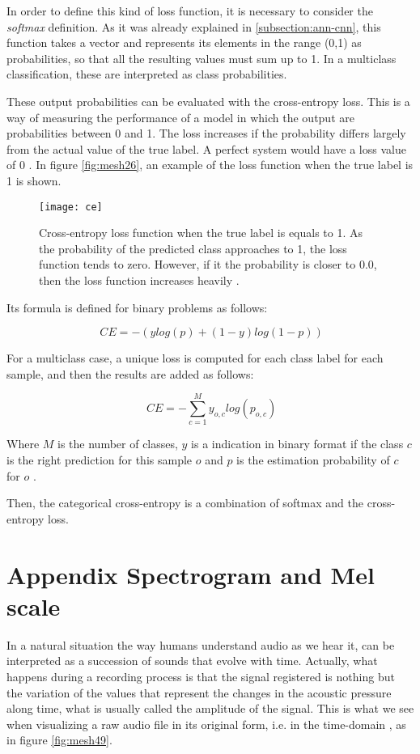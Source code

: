 	In order to define this kind of loss function, it is necessary to consider the \textit{softmax} definition. As it was already explained in \ref{subsection:ann-cnn}, this function takes a vector and represents its elements in the range (0,1) as probabilities, so that all the resulting values must sum up to 1. In a multiclass classification, these are interpreted as class probabilities.
	
	These output probabilities can be evaluated with the cross-entropy loss. This is a way of measuring the performance of a model in which the output are probabilities between 0 and 1. The loss increases if the probability differs largely from the actual value of the true label. A perfect system would have a loss value of 0 \cite{MLGlossary2017}. In figure \ref{fig:mesh26}, an example of the loss function when the true label is 1 is shown.
	
	\begin{figure}[H]
		\centering
		\captionsetup{justification=centering}
		\texttt{[image: ce]}
		\caption{Cross-entropy loss function when the true label is equals to 1. As the probability of the predicted class approaches to 1, the loss function tends to zero. However, if it the probability is closer to 0.0, then the loss function increases heavily \cite{MLGlossary2017}.}
	\end{figure}

	Its formula is defined for binary problems as follows:
	
	\[
	\ CE = -(ylog(p) + (1 - y)log(1 - p))
	\]

	For a multiclass case, a unique loss is computed for each class label for each sample, and then the results are added as follows:
	
	\[
	\ CE = - \sum_{c=1}^{M} y_{o,c}log(p_{o,c})
	\]
	
	Where $M$ is the number of classes, $y$ is a indication in binary format if the class $c$ is the right prediction for this sample $o$ and $p$ is the estimation probability of $c$ for $o$ \cite{MLGlossary2017}. 
	
	Then, the categorical cross-entropy is a combination of softmax and the cross-entropy loss.
	
\chapter{Appendix Spectrogram and Mel scale}
\label{appendix:spectrogram-mel-scale}

	In a natural situation the way humans understand audio as we hear it, can be interpreted as a succession of sounds that evolve with time. Actually, what happens during a recording process is that the signal registered is nothing but the variation of the values that represent the changes in the acoustic pressure along time, what is usually called the amplitude of the signal. This is what we see when visualizing a raw audio file in its original form, i.e. in the time-domain \cite{Laskaris2019}, as in figure \ref{fig:mesh49}.
	
